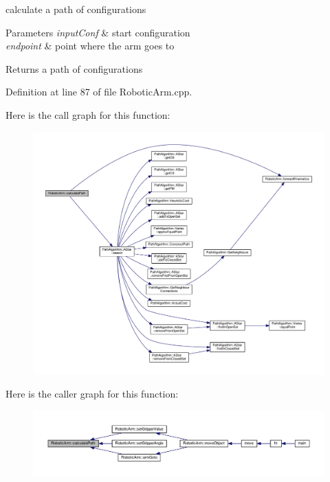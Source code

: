 calculate a path of configurations 


\begin{DoxyParams}{Parameters}
{\em input\+Conf} & start configuration \\
\hline
{\em endpoint} & point where the arm goes to \\
\hline
\end{DoxyParams}
\begin{DoxyReturn}{Returns}
a path of configurations 
\end{DoxyReturn}


Definition at line 87 of file Robotic\+Arm.\+cpp.



Here is the call graph for this function\+:
\nopagebreak
\begin{figure}[H]
\begin{center}
\leavevmode
\includegraphics[width=350pt]{class_robotic_arm_ae925ea4c5ea53ca359399a07d0ef4f76_cgraph}
\end{center}
\end{figure}




Here is the caller graph for this function\+:\nopagebreak
\begin{figure}[H]
\begin{center}
\leavevmode
\includegraphics[width=350pt]{class_robotic_arm_ae925ea4c5ea53ca359399a07d0ef4f76_icgraph}
\end{center}
\end{figure}


